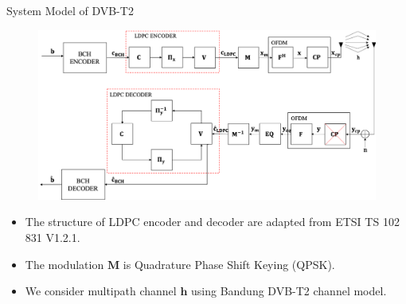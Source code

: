 \documentclass[11pt, aspectratio=169]{beamer}
\begin{document}


\begin{frame}{System Model of DVB-T2}
\vspace{-10pt}
\begin{figure}
\centering 
\includegraphics[scale=0.25]{gambarafa/sistemmo}
\label{sistemmodelMQCLDPC} %
\end{figure}
\vspace{-5pt}
\begin{itemize}
\item The structure of LDPC encoder and decoder are adapted from ETSI TS 102 831 V1.2.1.
\item The modulation $\mathbf{M}$ is Quadrature Phase Shift Keying (QPSK). 
\item We consider multipath channel $\mathbf{h}$ using Bandung DVB-T2 channel model.
\end{itemize}
\end{frame}
\end{document}
